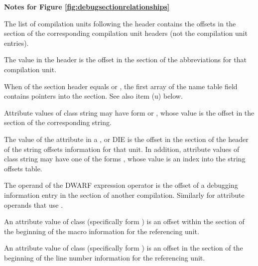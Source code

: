 \clearpage
\begin{center}
   \textbf{Notes for Figure \ref{fig:debugsectionrelationships}}
\end{center}
\begin{description}

%
\bb
{}
\eb
The list of compilation units following the header 
contains the offsets in the
\dotdebuginfo{} section of the 
corresponding compilation unit headers (not
the compilation unit entries). 

%
\bb
{}
\eb
The \HFNdebugabbrevoffset{} value in the header is the offset in the
\dotdebugabbrev{} 
section of the abbreviations for that compilation unit.

\bb
{}
When \HFNstrformat{} of the section header equals \DWFORMstrp{}
or \DWFORMstrpeight{}, the first array of the name table
field contains pointers into the \dotdebugstr{} section.
See also item (u) below.
\eb

Attribute values of class string may have form \DWFORMstrp{}
\bb
or \DWFORMstrpeight{},
\eb
whose value is the offset in the \dotdebugstr{}
section of the corresponding string.

The value of the 
\bb
\DWATstroffsets{} 
\eb
attribute in a
\DWTAGcompileunit{}, \DWTAGtypeunit{} or \DWTAGpartialunit{} 
DIE is the offset in the
\dotdebugstroffsets{} section of the 
\bb
header of the string offsets information
\eb
{}
for that unit.
In addition, attribute values of class string may have 
one of the forms 
\DWFORMstrxXNor, whose value is an index into the
string offsets table.

The operand of the \DWOPcallref{} 
DWARF expression operator is the
offset of a debugging information entry in the 
\dotdebuginfo{} section of another compilation.
Similarly for attribute operands that use
\DWFORMrefaddr.

An attribute value of class 
 (specifically form
\DWFORMsecoffset) is an 
offset within the 
\dotdebugmacro{} section
of the beginning of the macro information for the referencing unit.

An attribute value of class 
 (specifically form
\DWFORMsecoffset) 
is an offset in the 
\dotdebugline{} section of the
beginning of the line number information for the referencing unit.


\end{description}
